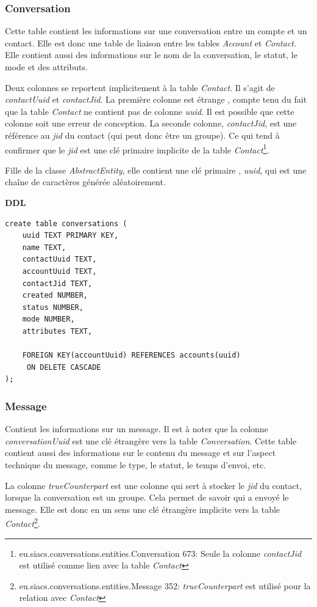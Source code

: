 \documentclass[a4paper,11pt]{article}
\begin{document}
\subsubsection*{Conversation}

Cette table contient les informations sur une conversation entre un compte et un contact. Elle est donc une table de liaison entre les tables \textit{Account} et \textit{Contact}. Elle contient aussi des informations sur le nom de la conversation, le statut, le mode et des attributs.

Deux colonnes se reportent implicitement à la table \textit{Contact}. Il s'agit de \textit{contactUuid} et \textit{contactJid}. La première colonne est étrange , compte  tenu du fait que la table \textit{Contact} ne contient pas de colonne \textit{uuid}. Il est possible que cette colonne soit une erreur de conception. La seconde colonne, \textit{contactJid}, est une référence au \textit{jid} du contact (qui peut donc être un groupe). Ce qui tend à confirmer que le \textit{jid} est une clé primaire implicite de la table \textit{Contact}\footnote{eu.siacs.conversations.entities.Conversation 673: Seule la colonne \textit{contactJid} est utilisé comme lien avec la table \textit{Contact}}.

Fille de la classe \textit{AbstractEntity}, elle contient une clé primaire , \textit{uuid}, qui est une chaîne de caractères générée aléatoirement.

\textbf{DDL}
\begin{lstlisting}
create table conversations (
    uuid TEXT PRIMARY KEY,
    name TEXT,
    contactUuid TEXT,
    accountUuid TEXT,
    contactJid TEXT,
    created NUMBER,
    status NUMBER,
    mode NUMBER,
    attributes TEXT, 
    
    FOREIGN KEY(accountUuid) REFERENCES accounts(uuid)
     ON DELETE CASCADE
);
\end{lstlisting}
\subsubsection*{Message}

Contient les informations sur un message. Il est à noter que la colonne \textit{conversationUuid} est une clé étrangère vers la table \textit{Conversation}. Cette table contient aussi des informations sur le contenu du message et sur l'aspect technique du message, comme le type, le statut, le temps d'envoi, etc.

La colonne \textit{trueCounterpart} est une colonne qui sert à stocker le \textit{jid} du contact, lorsque la conversation est un groupe. Cela permet de savoir qui a envoyé le message. Elle est donc en un sens une clé étrangère implicite vers la table \textit{Contact}\footnote{eu.siacs.conversations.entities.Message 352: \textit{trueCounterpart} est utilisé pour la relation avec \textit{Contact}}.
\end{document}
